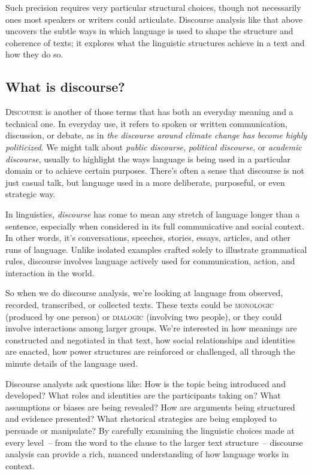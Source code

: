 Such precision requires very particular structural choices, though not necessarily ones most speakers or writers could articulate. Discourse analysis like that above uncovers the subtle ways in which language is used to shape the structure and coherence of texts; it explores what the linguistic structures achieve in a text and how they do so.

\subsection{What is discourse?}

\textsc{Discourse} is another of those terms that has both an everyday meaning and a technical one. In everyday use, it refers to spoken or written communication, discussion, or debate, as in \textit{the discourse around climate change has become highly politicized}. We might talk about \textit{public discourse}, \textit{political discourse}, or \textit{academic discourse}, usually to highlight the ways language is being used in a particular domain or to achieve certain purposes. There's often a sense that discourse is not just casual talk, but language used in a more deliberate, purposeful, or even strategic way.

In linguistics, \textit{discourse} has come to mean any stretch of language longer than a sentence, especially when considered in its full communicative and social context. In other words, it's conversations, speeches, stories, essays, articles, and other runs of language. Unlike isolated examples crafted solely to illustrate grammatical rules, discourse involves language actively used for communication, action, and interaction in the world.

So when we do discourse analysis, we're looking at language from observed, recorded, transcribed, or collected texts. These texts could be \textsc{monologic} (produced by one person) or \textsc{dialogic} (involving two people), or they could involve interactions among larger groups. We're interested in how meanings are constructed and negotiated in that text, how social relationships and identities are enacted, how power structures are reinforced or challenged, all through the minute details of the language used.

Discourse analysts ask questions like: How is the topic being introduced and developed? What roles and identities are the participants taking on? What assumptions or biases are being revealed? How are arguments being structured and evidence presented? What rhetorical strategies are being employed to persuade or manipulate? By carefully examining the linguistic choices made at every level~-- from the word to the clause to the larger text structure~-- discourse analysis can provide a rich, nuanced understanding of how language works in context.

